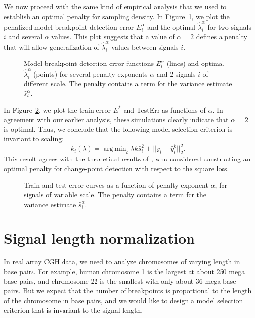 \documentclass{jsfds} %
\newcommand{\fig}[3][H]{
  \begin{figure}[#1]
    \hskip -1cm
    
    \caption{#3}
    \label{fig:#2}
  \end{figure}
}
\DeclareMathOperator*{\argmin}{arg\,min}
\begin{document}
\newpage

We now proceed with the same kind of empirical analysis that we used
to establish an optimal penalty for sampling density. In
Figure~\ref{fig:variable-scale-berr}, we plot the penalized model
breakpoint detection error $E_i^\alpha$ and the optimal $\hat
\lambda_i^\alpha$ for two signals $i$ and several $\alpha$ values.
This plot suggests that a value of $\alpha=2$ defines a penalty that
will allow generalization of $\hat \lambda^\alpha_i$ values between
signals $i$.

\fig{variable-scale-berr}{Model breakpoint detection error functions
  $E_i^\alpha$ (lines) and optimal $\hat \lambda_i^\alpha$ (points)
  for several penalty exponents $\alpha$ and 2 signals $i$ of
  different scale. The penalty contains a term for the variance
  estimate $\hat s_i^\alpha$.}

\newpage

In Figure~\ref{fig:variable-scale-error-alpha}, we plot the train
error $E^*$ and TestErr as functions of $\alpha$.  In agreement with
our earlier analysis, these simulations clearly indicate that
$\alpha=2$ is optimal. Thus, we conclude that the following model
selection criterion is invariant to scaling:
\begin{equation}
  \label{eq:kstar_shat_opt}
  k_i(\lambda) = \argmin_k \lambda k \hat s_i^2 + ||y_i-\hat y_i^k||^2_2.
\end{equation}
This result agrees with the theoretical results of \citet{lebarbier},
who considered constructing an optimal penalty for change-point
detection with respect to the square loss.


\fig{variable-scale-error-alpha}{Train and test error curves as a
  function of penalty exponent $\alpha$, for signals of variable
  scale. The penalty contains a term for the variance estimate $\hat
  s_i^\alpha$.}



\newpage
\section{Signal length normalization}
\label{variable_size}
In real array CGH data, we need to analyze chromosomes of varying length
in base pairs. For example, human chromosome 1 is the largest at about
250 mega base pairs, and chromosome 22 is the smallest with only about
36 mega base pairs. But we expect that the number of breakpoints is
proportional to the length of the chromosome in base pairs, and we would
like to design a model selection criterion that is invariant to the
signal length.
\end{document}
